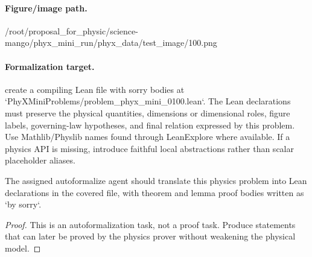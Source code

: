 \paragraph{Figure/image path.}
/root/proposal\_for\_physic/science-mango/phyx\_mini\_run/phyx\_data/test\_image/100.png

\paragraph{Formalization target.}
create a compiling Lean file with sorry bodies at `PhyXMiniProblems/problem\_phyx\_mini\_0100.lean`. The Lean declarations must preserve the physical quantities, dimensions or dimensional roles, figure labels, governing-law hypotheses, and final relation expressed by this problem.
Use Mathlib/Physlib names found through LeanExplore where available. If a physics API is missing, introduce faithful local abstractions rather than scalar placeholder aliases.

\begin{theorem}
\label{thm:physics:phyx_mini_0100:target}
The assigned autoformalize agent should translate this physics problem into Lean declarations in the covered file, with theorem and lemma proof bodies written as `by sorry`.
\end{theorem}
\begin{proof}
This is an autoformalization task, not a proof task. Produce statements that can later be proved by the physics prover without weakening the physical model.
\end{proof}


